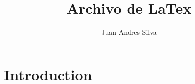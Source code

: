 \documentclass{article}
\title{Archivo de LaTex}
\author{Juan Andres Silva}
\begin{document}
	
	\maketitle
	
	\section{Introduction}
	
\end{document}
